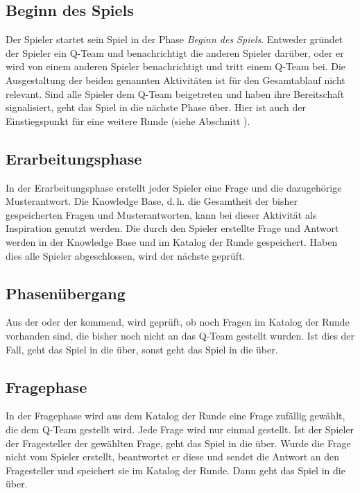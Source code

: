 \documentclass[a4paper,11pt,listof=numbered,glossary=totoc,parskip=half,toc=bib]{scrreprt}
\newcommand{\dash}{\mbox{d.\,h.}\xspace}
\begin{document}
	
	\subsection{Beginn des Spiels}
	\label{subsec:beginndesspiels}
	Der Spieler startet sein Spiel in der Phase \textit{Beginn des Spiels}. Entweder gründet der Spieler ein Q-Team und benachrichtigt die anderen Spieler darüber, oder er wird von einem anderen Spieler benachrichtigt und tritt einem Q-Team bei. 
	Die Ausgestaltung der beiden genannten Aktivitäten ist für den Gesamtablauf nicht relevant. Sind alle Spieler dem Q-Team beigetreten und haben ihre Bereitschaft signalisiert, geht das Spiel in die nächste Phase über. Hier ist auch der Einstiegspunkt für eine weitere Runde (siehe Abschnitt ).
	
	\subsection{Erarbeitungsphase}
	\label{subsec:erarbeitungsphase}
	In der Erarbeitungsphase erstellt jeder Spieler eine Frage und die dazugehörige Musterantwort. Die Knowledge Base, \dash die Gesamtheit der bisher gespeicherten Fragen und Musterantworten, kann bei dieser Aktivität als Inspiration genutzt werden. Die durch den Spieler erstellte Frage und Antwort werden in der Knowledge Base und im Katalog der Runde gespeichert. Haben dies alle Spieler abgeschlossen, wird der nächste  geprüft.
	
	\subsection{Phasenübergang}
	\label{subsec:phasenuebergang}
	Aus der  oder der  kommend, wird geprüft, ob noch Fragen im Katalog der Runde vorhanden sind, die bisher noch nicht an das Q-Team gestellt wurden. Ist dies der Fall, geht das Spiel in die  über, sonst geht das Spiel in die  über.
	
	\subsection{Fragephase}
	\label{subsec:fragephase}
	In der Fragephase wird aus dem Katalog der Runde eine Frage zufällig gewählt, die dem Q-Team gestellt wird. Jede Frage wird nur einmal gestellt. Ist der Spieler der Fragesteller der gewählten Frage, geht das Spiel in die  über. Wurde die Frage nicht vom Spieler erstellt, beantwortet er diese und sendet die Antwort an den Fragesteller und speichert sie im Katalog der Runde. Dann geht das Spiel in die  über.
	
\end{document}
